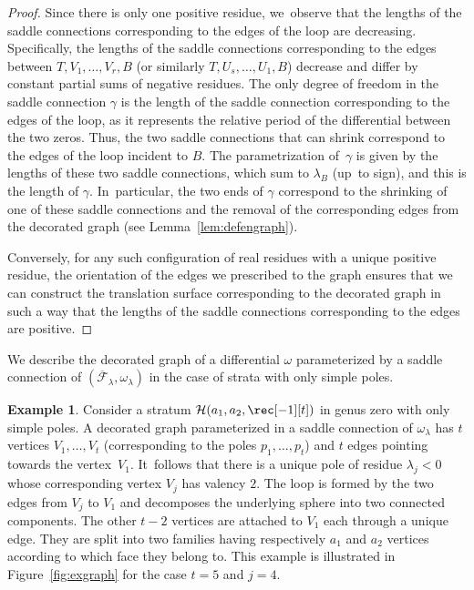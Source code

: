 \documentclass[JEP,XML,SOM,Unicode,NoFloatCountersInSection,published]{cedram}
\newcommand\calH{{\mathcal H}}
\theoremstyle{definition}
\newtheorem{ex}[thm]{Example}
\begin{document}
\begin{proof}
Since there is only one positive residue, we~observe that the lengths of the saddle connections corresponding to the edges of the loop are decreasing. Specifically, the lengths of the saddle connections corresponding to the edges between $T,V_{1},\dots,V_{r},B$ (or similarly $T,U_{s},\dots,U_{1},B$) decrease and differ by constant partial sums of negative residues. The only degree of freedom in the saddle connection $\gamma$ is the length of the saddle connection corresponding to the edges of the loop, as it represents the relative period of the differential between the two zeros. Thus, the two saddle connections that can shrink correspond to the edges of the loop incident to $B$. The parametrization of~$\gamma$ is given by the lengths of these two saddle connections, which sum to $\lambda_{B}$ (up~to sign), and this is the length of $\gamma$. In~particular, the two ends of $\gamma$ correspond to the shrinking of one of these saddle connections and the removal of the corresponding edges from the decorated graph (see Lemma~\ref{lem:defengraph}).

Conversely, for any such configuration of real residues with a unique positive residue, the orientation of the edges we prescribed to the graph ensures that we can construct the translation surface corresponding to the decorated graph in such a way that the lengths of the saddle connections corresponding to the edges are positive.
\end{proof}

We describe the decorated graph of a differential $\omega$ parameterized by a saddle connection of $(\overline{\mathcal{F}}_{\lambda}, \omega_\lambda)$ in the case of strata with only simple poles.
\begin{ex}
Consider a stratum $\calH(a_{1},a_{2},\rec[-1][t])$ in genus zero with only simple poles. A decorated graph parameterized in a saddle connection of $\omega_\lambda$
has $t$ vertices $V_{1},\dots,V_{t}$ (corresponding to the poles $p_{1},\dots,p_{t}$) and $t$ edges pointing towards the vertex~$V_{1}$. It~follows that there is a unique pole of residue $\lambda_{j}<0$ whose corresponding vertex $V_{j}$ has valency $2$. The loop is formed by the two edges from $V_{j}$ to $V_{1}$ and decomposes the underlying sphere into two connected components. The other $t-2$ vertices are attached to $V_{1}$ each through a unique edge. They are split into two families having respectively $a_{1}$ and $a_{2}$ vertices according to which face they belong to. This example is illustrated in Figure~\ref{fig:exgraph} for the case $t = 5$ and $j=4$.
\end{ex}
\end{document}
